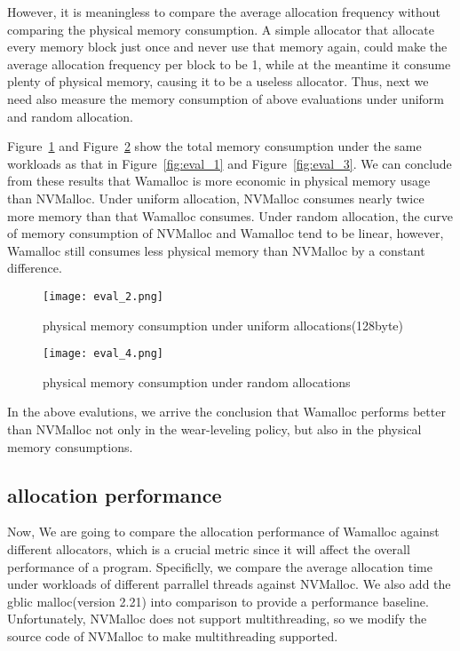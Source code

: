 \documentclass{vldb}
\begin{document}
However, it is meaningless to compare the average allocation frequency without comparing the physical memory consumption.
A simple allocator that allocate every memory block just once and never use that memory again, could make the average allocation frequency per block to be 1, while at the meantime it consume plenty of physical memory, causing it to be a useless allocator.
Thus, next we need also measure the memory consumption of above evaluations under uniform and random allocation.

Figure~\ref{fig:eval_2} and Figure~\ref{fig:eval_4} show the total memory consumption under the same workloads as that in Figure~\ref{fig:eval_1} and Figure~\ref{fig:eval_3}.
We can conclude from these results that 
Wamalloc is more economic in physical memory usage than NVMalloc.
Under uniform allocation, NVMalloc consumes nearly twice more memory than that Wamalloc consumes.
Under random allocation, the curve of memory consumption of NVMalloc and Wamalloc tend to be linear, 
however, Wamalloc still consumes less physical memory than NVMalloc by a constant difference.

\begin{figure}[t]
\centering
\texttt{[image: eval\_2.png]}
\caption{physical memory consumption under uniform allocations(128byte)}
\label{fig:eval_2}
\end{figure}

\begin{figure}[t]
\centering
\texttt{[image: eval\_4.png]}
\caption{physical memory consumption under random allocations}
\label{fig:eval_4}
\end{figure}

In the above evalutions, we arrive the conclusion that
Wamalloc performs better than NVMalloc not only in the wear-leveling policy,
but also in the physical memory consumptions.

\subsection{allocation performance}

Now, We are going to compare the allocation performance of Wamalloc against different allocators,
which is a crucial metric since it will affect the overall performance of a program.
Specificlly, we compare the average allocation time under workloads of different parrallel threads against NVMalloc.
We also add the gblic malloc(version 2.21) into comparison to provide a performance baseline.
Unfortunately, NVMalloc does not support multithreading,
so we modify the source code of NVMalloc to make multithreading supported.
\end{document}
